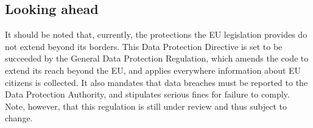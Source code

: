 \documentclass[12pt]{article}
\begin{document}





\subsection{Looking ahead}

It should be noted that, currently, the protections the EU legislation provides do not extend beyond its borders.
This Data Protection Directive is set to be succeeded by the General Data Protection Regulation, which amends the code to extend its reach beyond the EU, and applies everywhere information about EU citizens is collected.
It also mandates that data breaches must be reported to the Data Protection Authority, and stipulates serious fines for failure to comply.
Note, however, that this regulation is still under review and thus subject to change.
\end{document}
